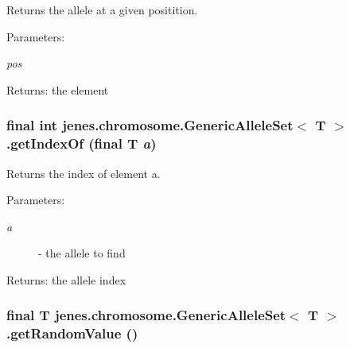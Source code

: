 Returns the allele at a given positition. \begin{Desc}
\item[Parameters:]
\begin{description}
\item[{\em pos}]\end{description}
\end{Desc}
\begin{Desc}
\item[Returns:]the element \end{Desc}
\hypertarget{classjenes_1_1chromosome_1_1_generic_allele_set_3_01_t_01_4_9b5dd0079f5d0cb76d2f89e92bde3fa6}{
\subsubsection[getIndexOf]{\setlength{\rightskip}{0pt plus 5cm}final int jenes.chromosome.GenericAlleleSet$<$ T $>$.getIndexOf (final T {\em a})}}
\label{classjenes_1_1chromosome_1_1_generic_allele_set_3_01_t_01_4_9b5dd0079f5d0cb76d2f89e92bde3fa6}


Returns the index of element a.

\begin{Desc}
\item[Parameters:]
\begin{description}
\item[{\em a}]- the allele to find \end{description}
\end{Desc}
\begin{Desc}
\item[Returns:]the allele index \end{Desc}
\hypertarget{classjenes_1_1chromosome_1_1_generic_allele_set_3_01_t_01_4_2f330d71d992e0d724bc31730b56229e}{
\subsubsection[getRandomValue]{\setlength{\rightskip}{0pt plus 5cm}final T jenes.chromosome.GenericAlleleSet$<$ T $>$.getRandomValue ()}}
\label{classjenes_1_1chromosome_1_1_generic_allele_set_3_01_t_01_4_2f330d71d992e0d724bc31730b56229e}



